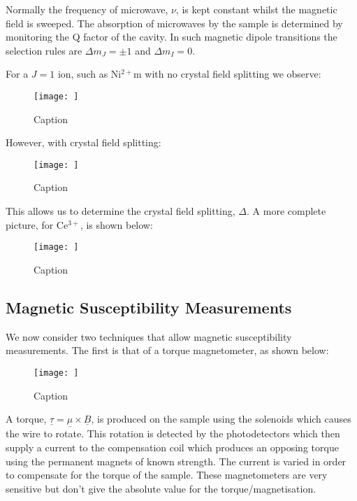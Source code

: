 \noindent Normally the frequency of microwave, $\nu$, is kept constant whilst the magnetic field is sweeped. The absorption of microwaves by the sample is determined by monitoring the Q factor of the cavity. In such magnetic dipole transitions the selection rules are $\Delta m_J = \pm1$ and $\Delta m_I = 0$.

\noindent For a $J = 1$ ion, such as Ni$^{2+}$m with no crystal field splitting we observe:

\begin{figure}
    \centering
    \texttt{[image: ]}
    \caption{Caption}
    \label{fig:enter-label}
\end{figure}

\noindent However, with crystal field splitting:

\begin{figure}
    \centering
    \texttt{[image: ]}
    \caption{Caption}
    \label{fig:enter-label}
\end{figure}

\noindent This allows us to determine the crystal field splitting, $\Delta$. A more complete picture, for Ce$^{3+}$, is shown below:

\begin{figure}
    \centering
    \texttt{[image: ]}
    \caption{Caption}
    \label{fig:enter-label}
\end{figure}

\subsection{Magnetic Susceptibility Measurements}

We now consider two techniques that allow magnetic susceptibility measurements. The first is that of a torque magnetometer, as shown below:

\begin{figure}
    \centering
    \texttt{[image: ]}
    \caption{Caption}
    \label{fig:enter-label}
\end{figure}

\noindent A torque, $\underline{\tau} = \underline{\mu} \times \underline{B}$, is produced on the sample using the solenoids which causes the wire to rotate. This rotation is detected by the photodetectors which then supply a current to the compensation coil which produces an opposing torque using the permanent magnets of known strength. The current is varied in order to compensate for the torque of the sample. These magnetometers are very sensitive but don't give the absolute value for the torque/magnetisation.

